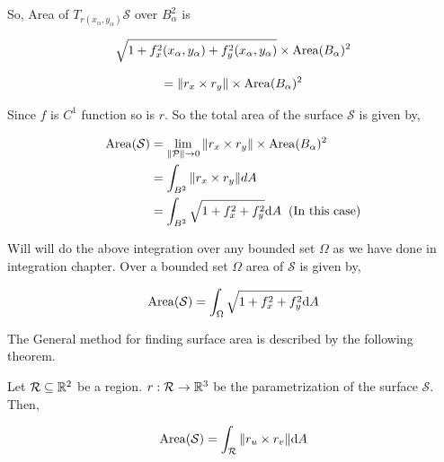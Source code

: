 \documentclass[../Analysis-3]{subfiles}
\begin{document}
So, Area of $T_{r(x_{\alpha},y_{\alpha})} \mathcal{S}$ over $B_{\alpha}^2$ is

$$\sqrt{1 + f_x^2(x_{\alpha},y_{\alpha}) + f_y^2(x_{\alpha},y_{\alpha})} \times \operatorname{Area}(B_{\alpha})^2$$

$$ = \norm{r_x \times r_y} \times \operatorname{Area}(B_{\alpha})^2$$

\pagebreak

Since $f$ is $C^1$ function so is $r$. So the total area of the surface $\mathcal{S}$ is given by,

\begin{align*}
    \operatorname{Area} (\mathcal{S}) & = \lim_{\norm{\mathcal{P}} \to 0} \norm{r_x \times r_y} \times \operatorname{Area}(B_{\alpha})^2 \\
                        & = \int_{B^2} \norm{r_x \times r_y} dA                                              \\
                        & = \int_{B^2} \sqrt{1 + f_x^2 +f_y^2} \dd A \hspace{0.2cm}(\text{In this case})
\end{align*}

Will will do the above integration over any bounded set $\Omega$ as we have done in  integration chapter. Over a bounded set $\Omega$ area of $\mathcal{S}$ is given by,

\begin{equation}
    \operatorname{Area} (\mathcal{S}) =  \int_{\Omega} \sqrt{1 + f_x^2 +f_y^2} \dd A \label{eq:surfa}
\end{equation}

The General method for finding surface area is described by the following theorem.

\begin{Thm}{}{}
    Let $\mathcal{R} \subseteq \mathbb{R}^2$ be a region. $r : \mathcal{R} \to \mathbb{R}^3$ be the parametrization of the surface $\mathcal{S}$. Then,

    \[\operatorname{Area}(\mathcal{S}) = \int_{\mathcal{R}} \norm{r_u \times r_v} \dd A\]
\end{Thm}
\end{document}
